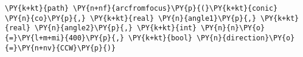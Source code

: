 \begin{Verbatim}[commandchars=\\\{\}]
    \PY{k+kt}{path} \PY{n+nf}{arcfromfocus}\PY{p}{(}\PY{k+kt}{conic} \PY{n}{co}\PY{p}{,} \PY{k+kt}{real} \PY{n}{angle1}\PY{p}{,} \PY{k+kt}{real} \PY{n}{angle2}\PY{p}{,} \PY{k+kt}{int} \PY{n}{n}\PY{o}{=}\PY{l+m+mi}{400}\PY{p}{,} \PY{k+kt}{bool} \PY{n}{direction}\PY{o}{=}\PY{n+nv}{CCW}\PY{p}{)}
\end{Verbatim}
